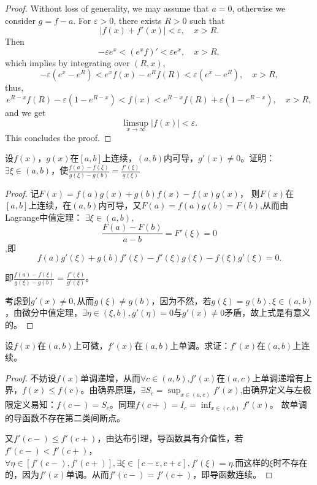   \begin{proof}
    Without loss of generality, we may assume that $a=0$, otherwise we consider $g=f-a$.
  For $\varepsilon>0$, there exists $R>0$ such that 
  \[
  |f(x)+f'(x)| < \varepsilon,\quad x>R.
  \]
  Then 
  \[
  -\varepsilon e^x < \left(e^xf\right)' < \varepsilon e^x,\quad x>R,
  \]
  which implies by integrating over $(R, x)$,
  \[
  -\varepsilon (e^x - e^R) < e^xf(x) - e^Rf(R) < \varepsilon(e^x-e^R),\quad x>R,
  \]
  thus,
  \[
  e^{R-x}f(R) - \varepsilon(1-e^{R-x}) < f(x) < e^{R-x}f(R) + \varepsilon(1-e^{R-x}), \quad x>R,
  \]
  and we get 
  \[
  \limsup_{x\to\infty}|f(x)| < \varepsilon.
  \]
  This concludes the proof.
  \end{proof}

  \begin{example}
   设$f(x)$，$g(x)$在$[a,b]$上连续，$(a,b)$内可导，$g'(x)\neq0$。证明：$\exists\xi\in(a,b)$，使$\frac{f(a)-f(\xi)}{g(\xi)-g(b)}=\frac{f'(\xi)}{g(\xi)}$
  \end{example}
  
  \begin{proof}
  记$F(x)=f(a)g(x)+g(b)f(x)-f(x)g(x)$，
  则$F(x)$在$[a,b]$上连续，在$(a,b)$内可导，又$F(a)=f(a)g(b)=F(b)$,从而由Lagrange中值定理：
  $\exists\xi\in(a,b),$$$\frac{F(a)-F(b)}{a-b}=F'(\xi)=0$$,即$$f(a)g'(\xi)+g(b)f'(\xi)-f'(\xi)g(\xi)-f(\xi)g'(\xi)=0.$$
  
  即$\frac{f(a)-f(\xi)}{g(\xi)-g(b)}=\frac{f'(\xi)}{g'(\xi)}$。
  
  考虑到$g'(x)\neq 0,$从而$g(\xi)\neq g(b)$，因为不然，若$g(\xi)=g(b),\xi\in(a,b)$，由微分中值定理，$\exists\eta\in(\xi,b),g'(\eta)=0$与$g'(x)\neq0$矛盾，故上式是有意义的。
  \end{proof}
  
  \begin{example}
   设$f(x)$在$(a,b)$上可微，$f'(x)$在$(a,b)$上单调。求证：$f'(x)$在$(a,b)$上连续。
  \end{example}
  
  \begin{proof}
  不妨设$f(x)$单调递增，从而$\forall c\in(a,b)$,$f'(x)$在$(a,c)$上单调递增有上界，$f(x)\leq f(c)$。由确界原理，$\exists S_c=\sup_{x\in(a,c)}f'(x)$,由确界定义与左极限定义易知：$f(c-)=S_c$。同理$f(c+)=I_c=\inf_{x\in(c,b)}f'(x)$。
  故单调的导函数不存在第二类间断点。
  
  又$f'(c-)\leq f'(c+)$，由达布引理，导函数具有介值性，若$f'(c-)<f'(c+)$，$\forall\eta\in[f'(c-),f'(c+)],\exists\xi\in[c-\varepsilon,c+\varepsilon],f'(\xi)=\eta.$而这样的$\xi$时不存在的，因为$f'(x)$单调。从而$f'(c-)=f'(c+)$，即导函数连续。
  \end{proof} 

